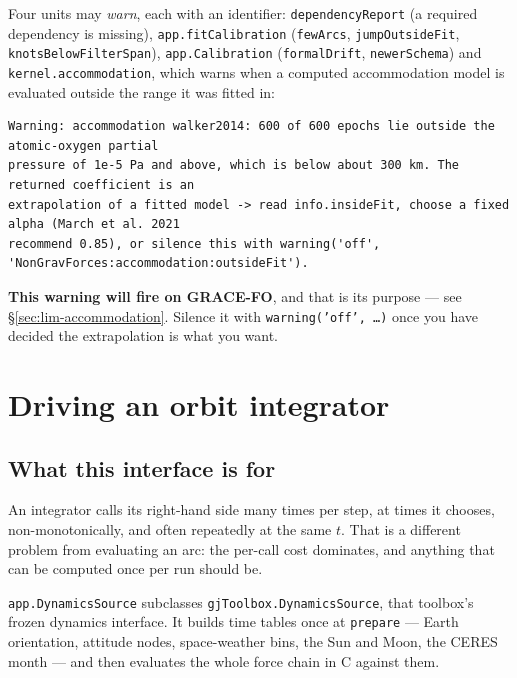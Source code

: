 \documentclass[11pt,a4paper]{report}
\begin{document}
Four units may \emph{warn}, each with an identifier: \texttt{dependencyReport} (a required
dependency is missing), \texttt{app.fitCalibration} (\texttt{fewArcs}, \texttt{jumpOutsideFit},
\texttt{knotsBelowFilterSpan}), \texttt{app.Calibration} (\texttt{formalDrift},
\texttt{newerSchema}) and \texttt{kernel.accommodation}, which warns when a computed accommodation model is evaluated outside the
range it was fitted in:

\begin{lstlisting}
Warning: accommodation walker2014: 600 of 600 epochs lie outside the atomic-oxygen partial
pressure of 1e-5 Pa and above, which is below about 300 km. The returned coefficient is an
extrapolation of a fitted model -> read info.insideFit, choose a fixed alpha (March et al. 2021
recommend 0.85), or silence this with warning('off', 'NonGravForces:accommodation:outsideFit').
\end{lstlisting}

\noindent \textbf{This warning will fire on GRACE-FO}, and that is its purpose --- see
\S\ref{sec:lim-accommodation}. Silence it with \texttt{warning('off', \ldots)} once you have decided
the extrapolation is what you want.

\chapter{Driving an orbit integrator}
\label{ch:integrator}

\section{What this interface is for}
An integrator calls its right-hand side many times per step, at times it chooses, non-monotonically,
and often repeatedly at the same $t$. That is a different problem from evaluating an arc: the
per-call cost dominates, and anything that can be computed once per run should be.

\texttt{app.DynamicsSource} subclasses \texttt{gjToolbox.DynamicsSource}, that toolbox's frozen
dynamics interface. It builds time tables once at \texttt{prepare} --- Earth orientation, attitude
nodes, space-weather bins, the Sun and Moon, the CERES month --- and then evaluates the whole force
chain in C against them.
\end{document}
